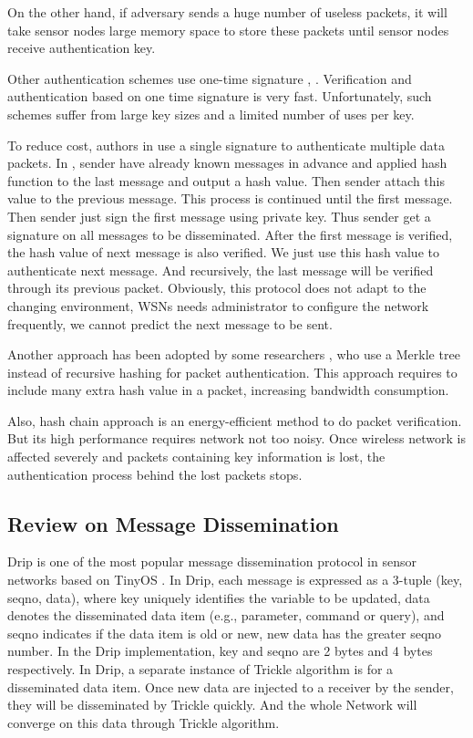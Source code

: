 \documentclass{sig-alternate-05-2015}
\begin{document}
On the other hand, if adversary sends a huge number of useless packets, it will take sensor nodes large memory space to store these packets until sensor nodes receive authentication key.

Other authentication schemes use one-time signature \cite{Biba}, \cite{HORSIC}. Verification and authentication based on one time signature is very fast. Unfortunately, such schemes suffer from large key sizes and a limited number of uses per key.

To reduce cost, authors in \cite{aspect} use a single signature to authenticate multiple data packets. In \cite{aspect}, sender have already known messages in advance and applied hash function to the last message and output a hash value. Then sender attach this value to the previous message. This process is continued until the first message. Then sender just sign the first message using private key. Thus sender get a signature on all messages to be disseminated. After the first message is verified, the hash value of next message is also verified. We just use this hash value to authenticate next message. And recursively, the last message will be verified through its previous packet. Obviously, this protocol does not adapt to the changing environment, WSNs needs administrator to configure the network frequently, we cannot predict the next message to be sent. 


Another approach has been adopted by some researchers \cite{hashtree} , who use a Merkle tree instead of recursive hashing for packet authentication. This approach requires to include many extra hash value in a packet, increasing bandwidth consumption.

Also, hash chain approach \cite{nested} is an energy-efficient method to do packet verification. But its high performance requires network not too noisy.  Once wireless network is affected severely and packets containing key information is lost, the authentication process behind the lost packets stops.
 
\subsection{Review on Message Dissemination}
Drip is one of the most popular message dissemination protocol in sensor networks based on TinyOS \cite{tinyos} . In Drip, each message is expressed as a 3-tuple (key, seqno, data), where key uniquely identifies the variable to be updated, data denotes the disseminated data item (e.g., parameter, command or query), and seqno indicates if the data item is old or new, new data has  the greater seqno number. In the Drip implementation, key and seqno are 2 bytes and 4 bytes respectively. In Drip, a separate instance of Trickle algorithm \cite{trickle} is for a disseminated data item. Once new data are injected to a receiver by the sender, they will be disseminated by Trickle quickly. And the whole Network will converge on this data through Trickle algorithm. 
\end{document}
